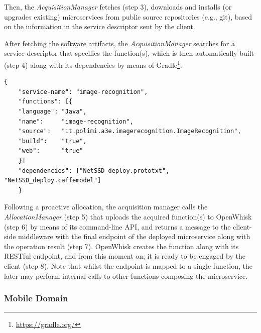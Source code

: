 Then, the \textit{AcquisitionManager} fetches (step 3), downloads and installs (or upgrades existing) microservices from public source repositories (e.g., git), based on the information in the service descriptor sent by the client. 

After fetching the software artifacts, the \textit{AcquisitionManager} searches for a service descriptor that specifies the function(s), which is then automatically built (step 4) along with its dependencies by means of Gradle\footnote{\url{https://gradle.org/}}.



\begin{minipage}{.9\linewidth}
	\begin{lstlisting}[caption=Image recognition service descriptor, label=lst:service-descriptor, captionpos=t]
	{
	"service-name":	"image-recognition",
	"functions": [{	
	"language":	"Java",
	"name":		"image-recognition",
	"source":	"it.polimi.a3e.imagerecognition.ImageRecognition",
	"build":	"true",
	"web":		"true"
	}]
	"dependencies": ["NetSSD_deploy.prototxt", "NetSSD_deploy.caffemodel"]
	}
	\end{lstlisting}
\end{minipage}

Following a proactive allocation, the acquisition manager calls the \textit{AllocationManager} (step 5) that uploads the acquired function(s) to OpenWhisk (step 6) by means of its command-line API, and returns a message to the client-side middleware with the final endpoint of the deployed microservice along with the operation result (step 7). OpenWhisk creates the function along with its RESTful endpoint, and from this moment on, it is ready to be engaged by the client (step 8). Note that whilst the endpoint is mapped to a single function, the later may perform internal calls to other functions composing the microservice.

\subsubsection{Mobile Domain}

